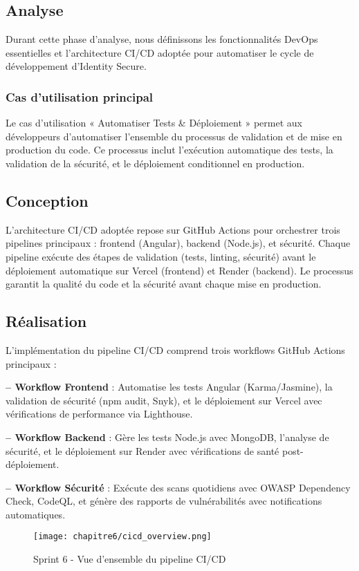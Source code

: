 \subsection{Analyse}
Durant cette phase d'analyse, nous définissons les fonctionnalités DevOps essentielles et l'architecture CI/CD adoptée pour automatiser le cycle de développement d'Identity Secure.

\subsubsection{Cas d'utilisation principal}
Le cas d'utilisation « Automatiser Tests \& Déploiement » permet aux développeurs d'automatiser l'ensemble du processus de validation et de mise en production du code. Ce processus inclut l'exécution automatique des tests, la validation de la sécurité, et le déploiement conditionnel en production.

\subsection{Conception}
L'architecture CI/CD adoptée repose sur GitHub Actions pour orchestrer trois pipelines principaux : frontend (Angular), backend (Node.js), et sécurité. Chaque pipeline exécute des étapes de validation (tests, linting, sécurité) avant le déploiement automatique sur Vercel (frontend) et Render (backend). Le processus garantit la qualité du code et la sécurité avant chaque mise en production.

\subsection{Réalisation}
L'implémentation du pipeline CI/CD comprend trois workflows GitHub Actions principaux :

\textbf{– Workflow Frontend} : Automatise les tests Angular (Karma/Jasmine), la validation de sécurité (npm audit, Snyk), et le déploiement sur Vercel avec vérifications de performance via Lighthouse.

\textbf{– Workflow Backend} : Gère les tests Node.js avec MongoDB, l'analyse de sécurité, et le déploiement sur Render avec vérifications de santé post-déploiement.

\textbf{– Workflow Sécurité} : Exécute des scans quotidiens avec OWASP Dependency Check, CodeQL, et génère des rapports de vulnérabilités avec notifications automatiques.

\begin{figure}[H]
\centering
\texttt{[image: chapitre6/cicd\_overview.png]}
\caption{ Sprint 6 - Vue d'ensemble du pipeline CI/CD }
\end{figure}

